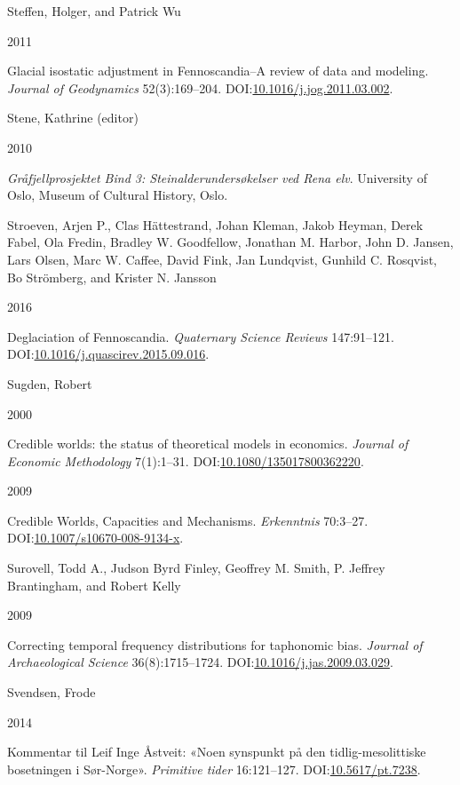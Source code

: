 \documentclass[
  12pt,
  a4paper,
  oneside]{book}
\newlength{\cslhangindent}
\newlength{\csllabelwidth}
\newlength{\cslentryspacingunit} %
\newenvironment{CSLReferences}[2] %
 {%
  \setlength{\parindent}{0pt}
  \ifodd #1
  \let\oldpar\par
  \def\par{\hangindent=\cslhangindent\oldpar}
  \fi
  \setlength{\parskip}{#2\cslentryspacingunit}
 }%
 {}
\newcommand{\CSLBlock}[1]{#1\hfill\break}
\newcommand{\CSLLeftMargin}[1]{\parbox[t]{\csllabelwidth}{#1}}
\newcommand{\CSLRightInline}[1]{\parbox[t]{\linewidth - \csllabelwidth}{#1}\break}
\begin{document}
\begin{CSLReferences}{0}{0}
\leavevmode{}%
\CSLBlock{Steffen, Holger, and Patrick Wu}
\CSLLeftMargin{ 2011}%
\CSLRightInline{{Glacial isostatic adjustment in Fennoscandia--A review of data and modeling}. \emph{Journal of Geodynamics} 52(3):169--204. DOI:\href{https://doi.org/10.1016/j.jog.2011.03.002}{10.1016/j.jog.2011.03.002}.}

\leavevmode{}%
\CSLBlock{Stene, Kathrine (editor)}
\CSLLeftMargin{ 2010}%
\CSLRightInline{\emph{{Gråfjellprosjektet Bind 3: Steinalderundersøkelser ved Rena elv}}. University of Oslo, Museum of Cultural History, Oslo.}

\leavevmode{}%
\CSLBlock{Stroeven, Arjen P., Clas Hättestrand, Johan Kleman, Jakob Heyman, Derek Fabel, Ola Fredin, Bradley W. Goodfellow, Jonathan M. Harbor, John D. Jansen, Lars Olsen, Marc W. Caffee, David Fink, Jan Lundqvist, Gunhild C. Rosqvist, Bo Strömberg, and Krister N. Jansson}
\CSLLeftMargin{ 2016}%
\CSLRightInline{Deglaciation of Fennoscandia. \emph{Quaternary Science Reviews} 147:91--121. DOI:\href{https://doi.org/10.1016/j.quascirev.2015.09.016}{10.1016/j.quascirev.2015.09.016}.}

\leavevmode{}%
\CSLBlock{Sugden, Robert}
\CSLLeftMargin{ 2000}%
\CSLRightInline{{Credible worlds: the status of theoretical models in economics}. \emph{Journal of Economic Methodology} 7(1):1--31. DOI:\href{https://doi.org/10.1080/135017800362220}{10.1080/135017800362220}.}

\leavevmode{}%
\CSLLeftMargin{ 2009 }%
\CSLRightInline{{Credible Worlds, Capacities and Mechanisms}. \emph{Erkenntnis} 70:3--27. DOI:\href{https://doi.org/10.1007/s10670-008-9134-x}{10.1007/s10670-008-9134-x}.}

\leavevmode{}%
\CSLBlock{Surovell, Todd A., Judson Byrd Finley, Geoffrey M. Smith, P. Jeffrey Brantingham, and Robert Kelly}
\CSLLeftMargin{ 2009}%
\CSLRightInline{{Correcting temporal frequency distributions for taphonomic bias}. \emph{Journal of Archaeological Science} 36(8):1715--1724. DOI:\href{https://doi.org/10.1016/j.jas.2009.03.029}{10.1016/j.jas.2009.03.029}.}

\leavevmode{}%
\CSLBlock{Svendsen, Frode}
\CSLLeftMargin{ 2014}%
\CSLRightInline{{Kommentar til Leif Inge Åstveit: «Noen synspunkt på den tidlig-mesolittiske bosetningen i Sør-Norge»}. \emph{Primitive tider} 16:121--127. DOI:\href{https://doi.org/10.5617/pt.7238}{10.5617/pt.7238}.}


\end{CSLReferences}
\end{document}

